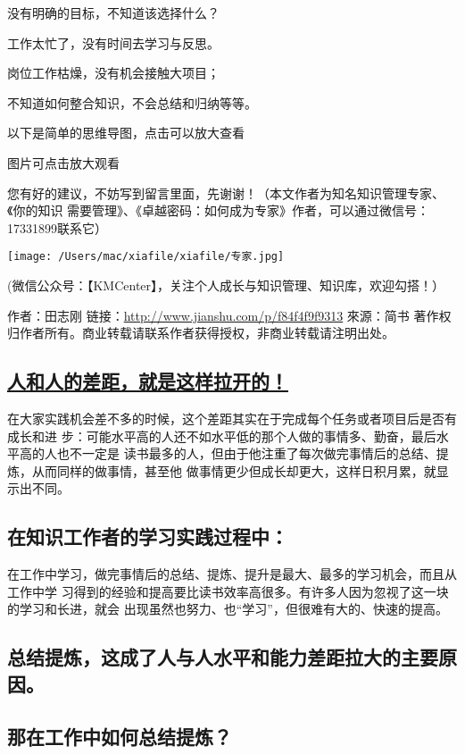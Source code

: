 \documentclass[11pt]{ctexart}
\begin{document}
{{{{没有明确的目标，不知道该选择什么？

工作太忙了，没有时间去学习与反思。

岗位工作枯燥，没有机会接触大项目；

不知道如何整合知识，不会总结和归纳等等。

以下是简单的思维导图，点击可以放大查看


图片可点击放大观看

您有好的建议，不妨写到留言里面，先谢谢！（本文作者为知名知识管理专家、《你的知识
需要管理》、《卓越密码：如何成为专家》作者，可以通过微信号：17331899联系它）
\begin{center}
\texttt{[image: /Users/mac/xiafile/xiafile/专家.jpg]}
\end{center}
(微信公众号：【KMCenter】，关注个人成长与知识管理、知识库，欢迎勾搭！）

作者：田志刚
链接：\url{http://www.jianshu.com/p/f84f4f9f9313}
來源：简书
著作权归作者所有。商业转载请联系作者获得授权，非商业转载请注明出处。
\subsection{\href{http://www.hao123.com/mid/15574105736349851150?key=\&from=tuijian\&pn=2}{人和人的差距，就是这样拉开的！}}
\label{sec:orgd9e7a96}
在大家实践机会差不多的时候，这个差距其实在于完成每个任务或者项目后是否有成长和进
步：可能水平高的人还不如水平低的那个人做的事情多、勤奋，最后水平高的人也不一定是
读书最多的人，但由于他注重了每次做完事情后的总结、提炼，从而同样的做事情，甚至他
做事情更少但成长却更大，这样日积月累，就显示出不同。

\subsection{在知识工作者的学习实践过程中：}
\label{sec:org4b50cec}
在工作中学习，做完事情后的总结、提炼、提升是最大、最多的学习机会，而且从工作中学
习得到的经验和提高要比读书效率高很多。有许多人因为忽视了这一块的学习和长进，就会
出现虽然也努力、也“学习”，但很难有大的、快速的提高。

\subsection{总结提炼，这成了人与人水平和能力差距拉大的主要原因。}
\label{sec:orgb4a1996}

\subsection{那在工作中如何总结提炼？}
\label{sec:org2acd046}

}}}}
\end{document}
